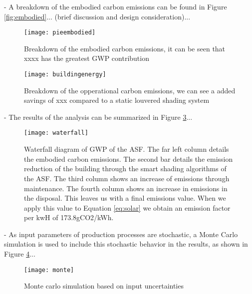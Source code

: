 


- A breakdown of the embodied carbon emissions can be found in Figure  \ref{fig:embodied}... (brief discussion and design consideration)...

\begin{figure}[H]
\begin{center}
\texttt{[image: pieembodied]}
\caption{Breakdown of the embodied carbon emissions, it can be seen that xxxx has the greatest GWP contribution}
\label{fig:pembodied}
\end{center}
\end{figure}


\begin{figure}[H]
\begin{center}
\texttt{[image: buildingenergy]}
\caption{Breakdown of the opperational carbon emissions, we can see a added savings of xxx compared to a static louvered shading system}
\label{fig:operational}
\end{center}
\end{figure}

- The results of the analysis can be summarized in Figure \ref{fig:waterfall}...

\begin{figure}[H]
\begin{center}
\texttt{[image: waterfall]}
\caption{Waterfall diagram of GWP of the ASF. The far left column details the embodied carbon emissions. The second bar details the emission reduction of the building through the smart shading algorithms of the ASF. The third column shows an increase of emissions through maintenance. The fourth column shows an increase in emissions in the disposal. This leaves us with a final emissions value. When we apply this value to Equation \ref{eq:solar} we obtain an emission factor per kwH of 173.8gCO2/kWh.}
\label{fig:waterfall}
\end{center}
\end{figure}


- As input parameters of production processes are stochastic, a Monte Carlo simulation is used to include this stochastic behavior in the results, as shown in Figure \ref{fig:monte}...

\begin{figure}[H]
\begin{center}
\texttt{[image: monte]}
\caption{Monte carlo simulation based on input uncertainties}
\label{fig:monte}
\end{center}
\end{figure}

